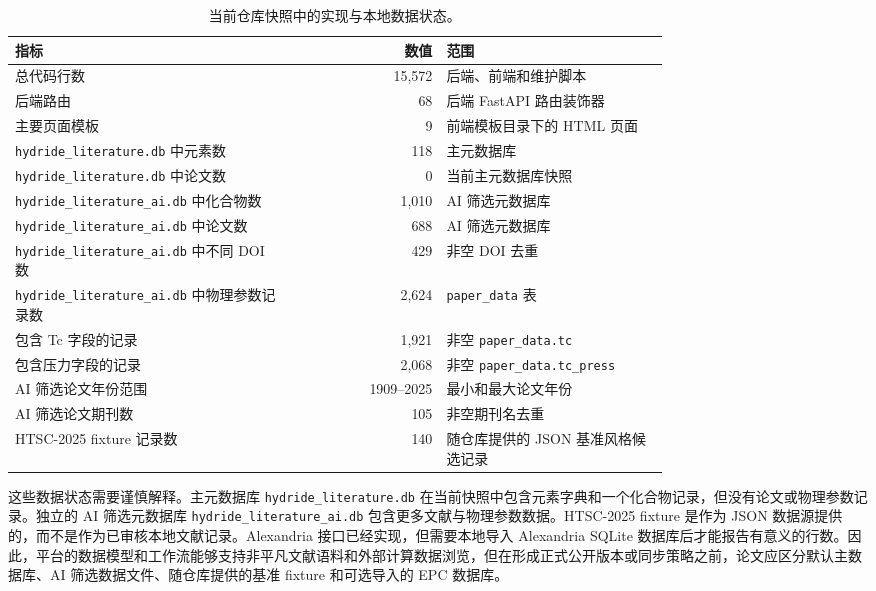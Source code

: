 \documentclass[11pt,a4paper]{ctexart}
\begin{document}
\begin{table}[t]
\centering
\caption{当前仓库快照中的实现与本地数据状态。}
\label{tab:status-zh}
\begin{tabular}{>{\raggedright\arraybackslash}p{0.42\linewidth} r >{\raggedright\arraybackslash}p{0.34\linewidth}}
\toprule
指标 & 数值 & 范围 \\
\midrule
总代码行数 & 15,572 & 后端、前端和维护脚本 \\
后端路由 & 68 & 后端 FastAPI 路由装饰器 \\
主要页面模板 & 9 & 前端模板目录下的 HTML 页面 \\
\texttt{hydride\_literature.db} 中元素数 & 118 & 主元数据库 \\
\texttt{hydride\_literature.db} 中论文数 & 0 & 当前主元数据库快照 \\
\texttt{hydride\_literature\_ai.db} 中化合物数 & 1,010 & AI 筛选元数据库 \\
\texttt{hydride\_literature\_ai.db} 中论文数 & 688 & AI 筛选元数据库 \\
\texttt{hydride\_literature\_ai.db} 中不同 DOI 数 & 429 & 非空 DOI 去重 \\
\texttt{hydride\_literature\_ai.db} 中物理参数记录数 & 2,624 & \texttt{paper\_data} 表 \\
包含 Tc 字段的记录 & 1,921 & 非空 \texttt{paper\_data.tc} \\
包含压力字段的记录 & 2,068 & 非空 \texttt{paper\_data.tc\_press} \\
AI 筛选论文年份范围 & 1909--2025 & 最小和最大论文年份 \\
AI 筛选论文期刊数 & 105 & 非空期刊名去重 \\
HTSC-2025 fixture 记录数 & 140 & 随仓库提供的 JSON 基准风格候选记录 \\
\bottomrule
\end{tabular}
\end{table}

这些数据状态需要谨慎解释。主元数据库 \texttt{hydride\_literature.db} 在当前快照中包含元素字典和一个化合物记录，但没有论文或物理参数记录。独立的 AI 筛选元数据库 \texttt{hydride\_literature\_ai.db} 包含更多文献与物理参数数据。HTSC-2025 fixture 是作为 JSON 数据源提供的，而不是作为已审核本地文献记录。Alexandria 接口已经实现，但需要本地导入 Alexandria SQLite 数据库后才能报告有意义的行数。因此，平台的数据模型和工作流能够支持非平凡文献语料和外部计算数据浏览，但在形成正式公开版本或同步策略之前，论文应区分默认主数据库、AI 筛选数据文件、随仓库提供的基准 fixture 和可选导入的 EPC 数据库。
\end{document}

